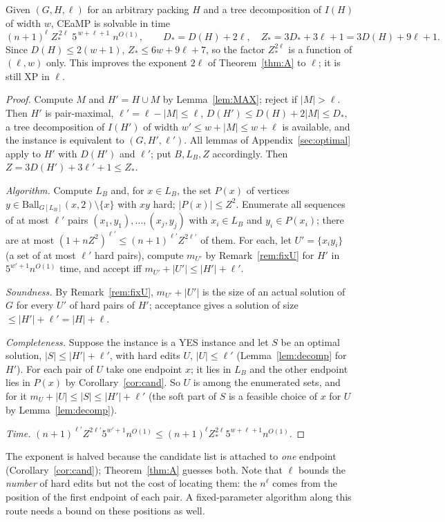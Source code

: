 \begin{theorem}\label{thm:nl}
Given $(G,H,\ell)$ for an arbitrary packing $H$ and a tree decomposition of $I(H)$ of width $w$, CEaMP is solvable in time
\[
(n+1)^{\ell}\;Z_*^{\,2\ell}\;5^{\,w+\ell+1}\;n^{O(1)},\qquad D_*=D(H)+2\ell,\quad Z_*=3D_*+3\ell+1=3D(H)+9\ell+1 .
\]
Since $D(H)\le2(w+1)$, $Z_*\le6w+9\ell+7$, so the factor $Z_*^{2\ell}$ is a function of $(\ell,w)$ only. This improves the exponent $2\ell$ of Theorem~\ref{thm:A} to $\ell$; it is still XP in $\ell$.
\end{theorem}
\begin{proof}
Compute $M$ and $H'=H\cup M$ by Lemma~\ref{lem:MAX}; reject if $|M|>\ell$. Then $H'$ is pair-maximal, $\ell'=\ell-|M|\le\ell$, $D(H')\le D(H)+2|M|\le D_*$, a tree decomposition of $I(H')$ of width $w'\le w+|M|\le w+\ell$ is available, and the instance is equivalent to $(G,H',\ell')$. All lemmas of Appendix~\ref{sec:optimal} apply to $H'$ with $D(H')$ and $\ell'$; put $B,L_B,Z$ accordingly. Then $Z=3D(H')+3\ell'+1\le Z_*$.

{\sloppy\emph{Algorithm.} Compute $L_B$ and, for $x\in L_B$, the set $P(x)$ of vertices $y\in\mathrm{Ball}_{G[L_B]}(x,2)\setminus\{x\}$ with $xy$ hard; $|P(x)|\le Z^2$. Enumerate all sequences of at most $\ell'$ pairs $(x_1,y_1),\dots,(x_j,y_j)$ with $x_i\in L_B$ and $y_i\in P(x_i)$; there are at most $(1+nZ^2)^{\ell'}\le(n+1)^{\ell'}Z^{2\ell'}$ of them. For each, let $U'=\{x_iy_i\}$ (a set of at most $\ell'$ hard pairs), compute $m_{U'}$ by Remark~\ref{rem:fixU} for $H'$ in $5^{w'+1}n^{O(1)}$ time, and accept iff $m_{U'}+|U'|\le|H'|+\ell'$.\par}

\emph{Soundness.} By Remark~\ref{rem:fixU}, $m_{U'}+|U'|$ is the size of an actual solution of $G$ for every $U'$ of hard pairs of $H'$; acceptance gives a solution of size $\le|H'|+\ell'=|H|+\ell$.

\emph{Completeness.} Suppose the instance is a YES instance and let $S$ be an optimal solution, $|S|\le|H'|+\ell'$, with hard edits $U$, $|U|\le\ell'$ (Lemma~\ref{lem:decomp} for $H'$). For each pair of $U$ take one endpoint $x$; it lies in $L_B$ and the other endpoint lies in $P(x)$ by Corollary~\ref{cor:cand}. So $U$ is among the enumerated sets, and for it $m_U+|U|\le|S|\le|H'|+\ell'$ (the soft part of $S$ is a feasible choice of $x$ for $U$ by Lemma~\ref{lem:decomp}).

\emph{Time.} $(n+1)^{\ell'}Z^{2\ell'}5^{w'+1}n^{O(1)}\le(n+1)^{\ell}Z_*^{2\ell}5^{w+\ell+1}n^{O(1)}$.
\end{proof}
The exponent is halved because the candidate list is attached to \emph{one} endpoint (Corollary~\ref{cor:cand}); Theorem~\ref{thm:A} guesses both. Note that $\ell$ bounds the \emph{number} of hard edits but not the cost of locating them: the $n^{\ell}$ comes from the position of the first endpoint of each pair. A fixed-parameter algorithm along this route needs a bound on these positions as well.

